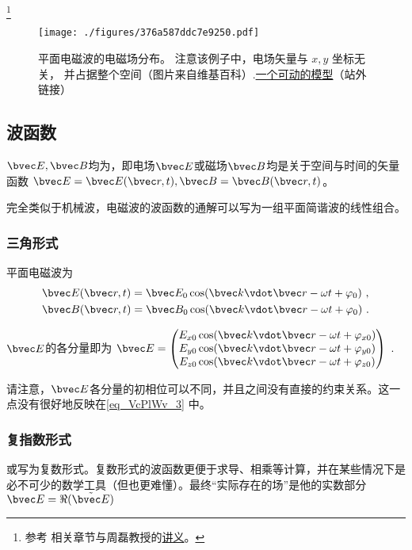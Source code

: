 

\footnote{参考 \cite{GriffE} 相关章节与周磊教授的\href{http://fdjpkc.fudan.edu.cn/d200927/2009/0314/c8569a14801/page.htm}{讲义}。}

\begin{figure}[ht]
\centering
\texttt{[image: ./figures/376a587ddc7e9250.pdf]}
\caption{平面电磁波的电磁场分布。 注意该例子中，电场矢量与 $x, y$ 坐标无关， 并占据整个空间（图片来自维基百科）.\href{https://www.geogebra.org/m/xhYwXSsH}{一个可动的模型}（站外链接）} \label{fig_VcPlWv_1}
\end{figure}

\subsection{波函数}
$\bvec E, \bvec B$均为，即电场$\bvec E$或磁场$\bvec B$均是关于空间与时间的矢量函数 $\bvec E = \bvec E(\bvec r, t), \bvec B = \bvec B(\bvec r, t)$。

完全类似于机械波，电磁波的波函数的通解可以写为一组平面简谐波的线性组合。

\subsubsection{三角形式}
平面电磁波为
\begin{align}\label{eq_VcPlWv_3}
&\bvec E(\bvec r, t) = \bvec E_0 \cos(\bvec k\vdot \bvec r - \omega t + \varphi_0)~,\\
&\bvec B(\bvec r, t) = \bvec B_0 \cos(\bvec k \vdot \bvec r - \omega t + \varphi_0)~.
\end{align}

$\bvec E$的各分量即为
$\bvec E = 
\begin{pmatrix}
E_{x0} \cos(\bvec k\vdot \bvec r - \omega t+ \varphi_{x0})\\
E_{y0} \cos(\bvec k\vdot \bvec r - \omega t+ \varphi_{y0})\\
E_{z0} \cos(\bvec k\vdot \bvec r - \omega t+ \varphi_{z0})\\
\end{pmatrix}~.
$

请注意，$\bvec E$各分量的初相位可以不同，并且之间没有直接的约束关系。这一点没有很好地反映在\autoref{eq_VcPlWv_3} 中。

\subsubsection{复指数形式}
或写为复数形式。复数形式的波函数更便于求导、相乘等计算，并在某些情况下是必不可少的数学工具（但也更难懂）。最终“实际存在的场”是他的实数部分 $\bvec E = \Re (\tilde {\bvec E})$

